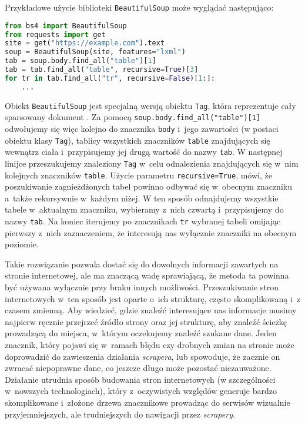 Przykładowe użycie biblioteki \texttt{BeautifulSoup} może wyglądać następująco:
\begin{lstlisting}[language=Python]
from bs4 import BeautifulSoup
from requests import get
site = get("https://example.com").text
soup = BeautifulSoup(site, features="lxml")
tab = soup.body.find_all("table")[1]
tab = tab.find_all("table", recursive=True)[3]
for tr in tab.find_all("tr", recursive=False)[1:]:
	...
\end{lstlisting}
Obiekt \texttt{BeautifulSoup} jest specjalną wersją obiektu \texttt{Tag}, która reprezentuje cały sparsowany dokument \cite{richardson2007beautiful}.
Za pomocą \lstinline{soup.body.find_all("table")[1]} odwołujemy się więc kolejno do znacznika \texttt{body} i~jego zawartości (w postaci obiektu klasy \texttt{Tag}),  tablicy wszystkich znaczników \texttt{table} znajdujących się wewnątrz ciała i~przypisujemy jej drugą wartość do nazwy \texttt{tab}.
W następnej linijce przeszukujemy znaleziony \texttt{Tag} w~celu odnalezienia znajdujących się w~nim kolejnych znaczników \texttt{table}.
Użycie parametru \lstinline{recursive=True}, mówi, że poszukiwanie zagnieżdżonych tabel powinno odbywać się w~obecnym znaczniku a~także rekursywnie w~każdym niżej.
W ten sposób odnajdujemy wszystkie tabele w~aktualnym znaczniku, wybieramy z~nich czwartą i~przypisujemy do nazwy \texttt{tab}.
Na koniec iterujemy po znacznikach \texttt{tr} wybranej tabeli omijając pierwszy z~nich zaznaczeniem, że interesują nas wyłącznie znaczniki na obecnym poziomie.

Takie rozwiązanie pozwala dostać się do dowolnych informacji zawartych na stronie internetowej, ale ma znaczącą wadę sprawiającą, że metoda ta powinna być używana wyłącznie przy braku innych możliwości.
Przeszukiwanie stron internetowych w~ten sposób jest oparte o~ich strukturę, często skomplikowaną i~z czasem zmienną.
Aby wiedzieć, gdzie znaleźć interesujące nas informacje musimy najpierw ręcznie przejrzeć źródło strony oraz jej strukturę, aby znaleźć ścieżkę prowadzącą do miejsca, w~którym oczekujemy znaleźć szukane dane.
Jeden znacznik, który pojawi się w~ramach błędu czy drobnych zmian na stronie może doprowadzić do zawieszenia działania \emph{scrapera}, lub spowoduje, że zacznie on zwracać niepoprawne dane, co jeszcze długo może pozostać niezauważone.
Działanie utrudnia sposób budowania stron internetowych (w szczególności w~nowszych technologiach), który z~oczywistych względów generuje bardzo skomplikowane i~złożone drzewa znacznikowe prowadząc do serwisów wizualnie przyjemniejszych, ale trudniejszych do nawigacji przez \emph{scrapery}.

